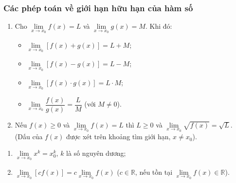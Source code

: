 \begin{tomtat}
	\subsubsection{Các phép toán về giới hạn hữu hạn của hàm số}
	\begin{enumerate}
		\item Cho $ \lim \limits_{x \to x_0} f(x) =L$ và $ \lim \limits_{x \to x_0} g(x)=M $. Khi đó:
		\begin{itemize}
			\item $ \lim \limits_{x \to x_0} [f(x)+g(x)]=L+M $;
			\item $ \lim \limits_{x \to x_0} [f(x)-g(x)]=L-M $;
			\item $ \lim \limits_{x \to x_0} [f(x)\cdot g(x)]=L\cdot M $;
			\item $ \lim \limits_{x \to x_0} \dfrac{f(x)}{g(x)}=\dfrac{L}{M} $ (với $ M\neq 0 $).			
		\end{itemize}
		\item Nếu $ f(x)\geq 0 $ và $ \lim \limits_{x \to x_0} f(x) =L$ thì $ L\geq 0 $ và $ \lim \limits_{x \to x_0} \sqrt{f(x)}=\sqrt{L} $.\\
		(Dấu của $ f(x) $ được xét trên khoảng tìm giới hạn, $ x\neq x_0 $).
	\end{enumerate}
	\begin{note} 
		\indent
		\begin{enumerate}
			\item $ \lim \limits_{x \to x_0} x^k=x_0^k $, $ k $ là số nguyên dương;
			\item $ \lim \limits_{x \to x_0} [cf(x)]=c\lim \limits_{x \to x_0} f(x) $ ($ c\in \mathbb{R} $, nếu tồn tại $ \lim \limits_{x \to x_0} f(x) \in \mathbb{R}$).
		\end{enumerate}
	\end{note} 
	

\end{tomtat}
